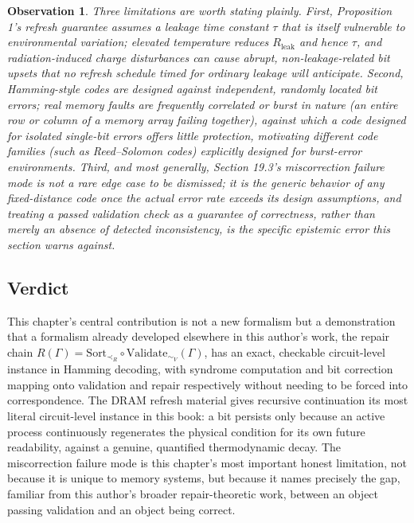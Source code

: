 \documentclass[12pt]{article}
\newtheorem{observation}{Observation}
\begin{document}
\begin{observation}
Three limitations are worth stating plainly. First, Proposition 1's refresh guarantee assumes a leakage time constant $\tau$ that is itself vulnerable to environmental variation; elevated temperature reduces $R_{\text{leak}}$ and hence $\tau$, and radiation-induced charge disturbances can cause abrupt, non-leakage-related bit upsets that no refresh schedule timed for ordinary leakage will anticipate. Second, Hamming-style codes are designed against independent, randomly located bit errors; real memory faults are frequently correlated or burst in nature (an entire row or column of a memory array failing together), against which a code designed for isolated single-bit errors offers little protection, motivating different code families (such as Reed--Solomon codes) explicitly designed for burst-error environments. Third, and most generally, Section 19.3's miscorrection failure mode is not a rare edge case to be dismissed; it is the generic behavior of any fixed-distance code once the actual error rate exceeds its design assumptions, and treating a passed validation check as a guarantee of correctness, rather than merely an absence of detected inconsistency, is the specific epistemic error this section warns against.
\end{observation}

\subsection{Verdict}

This chapter's central contribution is not a new formalism but a demonstration that a formalism already developed elsewhere in this author's work, the repair chain $R(\Gamma) = \text{Sort}_{\prec_R}\circ\text{Validate}_{\sim_V}(\Gamma)$, has an exact, checkable circuit-level instance in Hamming decoding, with syndrome computation and bit correction mapping onto validation and repair respectively without needing to be forced into correspondence. The DRAM refresh material gives recursive continuation its most literal circuit-level instance in this book: a bit persists only because an active process continuously regenerates the physical condition for its own future readability, against a genuine, quantified thermodynamic decay. The miscorrection failure mode is this chapter's most important honest limitation, not because it is unique to memory systems, but because it names precisely the gap, familiar from this author's broader repair-theoretic work, between an object passing validation and an object being correct.
\end{document}
